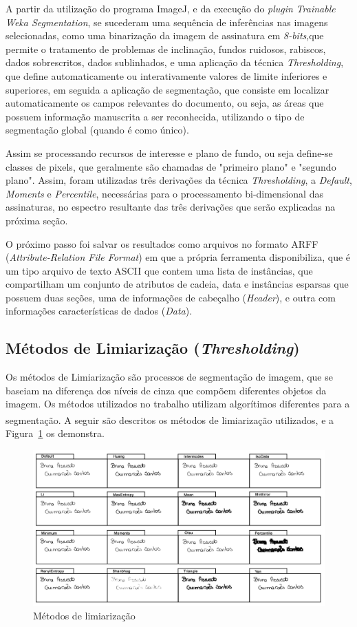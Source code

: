 \documentclass[12pt]{article}
\begin{document}
			A partir da utilização do programa ImageJ, e da execução do \textit{plugin} \textit{Trainable Weka Segmentation}, se sucederam uma sequência de inferências nas imagens selecionadas, como uma binarização da imagem de assinatura em \textit{8-bits},que permite o tratamento de problemas de inclinação, fundos ruidosos, rabiscos, dados sobrescritos, dados sublinhados, e uma aplicação da técnica \textit{Thresholding}, que define automaticamente ou interativamente valores de limite inferiores e superiores, em seguida a aplicação de segmentação, que consiste em localizar automaticamente os campos relevantes do documento, ou seja, as áreas que possuem informação manuscrita a ser reconhecida, utilizando o tipo de segmentação global (quando é como único).
			
			Assim se processando recursos de interesse e plano de fundo, ou seja define-se classes de pixels, que geralmente são chamadas de "primeiro plano" e "segundo plano". Assim, foram utilizadas três derivações da técnica \textit{Thresholding}, a \textit{Default}, \textit{Moments} e \textit{Percentile}, necessárias para o processamento bi-dimensional das assinaturas, no espectro resultante das três derivações que serão explicadas na próxima seção.
			
			O próximo passo foi salvar os resultados como arquivos no formato ARFF (\textit{Attribute-Relation File Format}) em que a própria ferramenta disponibiliza, que é um tipo arquivo de texto ASCII que contem uma lista de instâncias, que compartilham um conjunto de atributos de cadeia, data e instâncias esparsas que possuem duas seções, uma de informações de cabeçalho (\textit{Header}), e outra com informações características de dados (\textit{Data}).
		
			\subsection{Métodos de Limiarização (\textit{Thresholding})}
				Os métodos de Limiarização são processos de segmentação de imagem, que se baseiam na diferença dos níveis de cinza que compõem diferentes objetos da imagem. Os métodos utilizados no trabalho utilizam algorítimos diferentes para a segmentação\textsuperscript{\cite{eliceiri2017}}. A seguir são descritos os métodos de limiarização utilizados, e a Figura~\ref{fig:metodos} os demonstra.
				
			\begin{figure}[htb]
				\centering
				\includegraphics[scale= 0.09]{Met_threshold.jpg}
				\caption{Métodos de limiarização}
				\label{fig:metodos}
			\end{figure}
\end{document}
